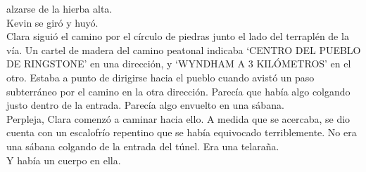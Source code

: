 alzarse de la hierba alta.\\
Kevin se giró y huyó.\\[2\baselineskip]Clara siguió el camino por el
círculo de piedras junto el lado del terraplén de la vía. Un cartel de
madera del camino peatonal indicaba `CENTRO DEL PUEBLO DE RINGSTONE' en
una dirección, y `WYNDHAM A 3 KILÓMETROS' en el otro. Estaba a punto de
dirigirse hacia el pueblo cuando avistó un paso subterráneo por el
camino en la otra dirección. Parecía que había algo colgando justo
dentro de la entrada. Parecía algo envuelto en una sábana.\\
Perpleja, Clara comenzó a caminar hacia ello. A medida que se acercaba,
se dio cuenta con un escalofrío repentino que se había equivocado
terriblemente. No era una sábana colgando de la entrada del túnel. Era
una telaraña.\\
Y había un cuerpo en ella.\\
